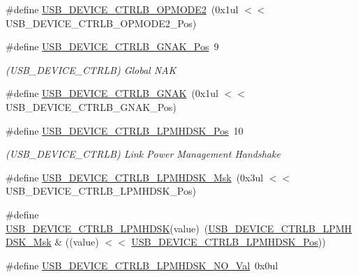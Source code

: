 \begin{DoxyCompactItemize}
\#define \mbox{\hyperlink{group___s_a_m_d21___u_s_b_ga7f75914b68600a87003a7109fad16f6f}{U\+S\+B\+\_\+\+D\+E\+V\+I\+C\+E\+\_\+\+C\+T\+R\+L\+B\+\_\+\+O\+P\+M\+O\+D\+E2}}~(0x1ul $<$$<$ U\+S\+B\+\_\+\+D\+E\+V\+I\+C\+E\+\_\+\+C\+T\+R\+L\+B\+\_\+\+O\+P\+M\+O\+D\+E2\+\_\+\+Pos)
\item 
\#define \mbox{\hyperlink{group___s_a_m_d21___u_s_b_ga0ed47cb7457c19bd0a460ec4f89f1d15}{U\+S\+B\+\_\+\+D\+E\+V\+I\+C\+E\+\_\+\+C\+T\+R\+L\+B\+\_\+\+G\+N\+A\+K\+\_\+\+Pos}}~9
\begin{DoxyCompactList}\small\item\em (U\+S\+B\+\_\+\+D\+E\+V\+I\+C\+E\+\_\+\+C\+T\+R\+LB) Global N\+AK \end{DoxyCompactList}\item 
\#define \mbox{\hyperlink{group___s_a_m_d21___u_s_b_gaf178d923d51212654a8a358a2bc7ddf5}{U\+S\+B\+\_\+\+D\+E\+V\+I\+C\+E\+\_\+\+C\+T\+R\+L\+B\+\_\+\+G\+N\+AK}}~(0x1ul $<$$<$ U\+S\+B\+\_\+\+D\+E\+V\+I\+C\+E\+\_\+\+C\+T\+R\+L\+B\+\_\+\+G\+N\+A\+K\+\_\+\+Pos)
\item 
\#define \mbox{\hyperlink{group___s_a_m_d21___u_s_b_ga7bbe2998f650533b2cc87bb63f7a28de}{U\+S\+B\+\_\+\+D\+E\+V\+I\+C\+E\+\_\+\+C\+T\+R\+L\+B\+\_\+\+L\+P\+M\+H\+D\+S\+K\+\_\+\+Pos}}~10
\begin{DoxyCompactList}\small\item\em (U\+S\+B\+\_\+\+D\+E\+V\+I\+C\+E\+\_\+\+C\+T\+R\+LB) Link Power Management Handshake \end{DoxyCompactList}\item 
\#define \mbox{\hyperlink{group___s_a_m_d21___u_s_b_gad54d31b65a2471f0f9932bf93317119b}{U\+S\+B\+\_\+\+D\+E\+V\+I\+C\+E\+\_\+\+C\+T\+R\+L\+B\+\_\+\+L\+P\+M\+H\+D\+S\+K\+\_\+\+Msk}}~(0x3ul $<$$<$ U\+S\+B\+\_\+\+D\+E\+V\+I\+C\+E\+\_\+\+C\+T\+R\+L\+B\+\_\+\+L\+P\+M\+H\+D\+S\+K\+\_\+\+Pos)
\item 
\#define \mbox{\hyperlink{group___s_a_m_d21___u_s_b_ga145da777e9fe034938c2cc897276ba0d}{U\+S\+B\+\_\+\+D\+E\+V\+I\+C\+E\+\_\+\+C\+T\+R\+L\+B\+\_\+\+L\+P\+M\+H\+D\+SK}}(value)~(\mbox{\hyperlink{group___s_a_m_d21___u_s_b_gad54d31b65a2471f0f9932bf93317119b}{U\+S\+B\+\_\+\+D\+E\+V\+I\+C\+E\+\_\+\+C\+T\+R\+L\+B\+\_\+\+L\+P\+M\+H\+D\+S\+K\+\_\+\+Msk}} \& ((value) $<$$<$ \mbox{\hyperlink{group___s_a_m_d21___u_s_b_ga7bbe2998f650533b2cc87bb63f7a28de}{U\+S\+B\+\_\+\+D\+E\+V\+I\+C\+E\+\_\+\+C\+T\+R\+L\+B\+\_\+\+L\+P\+M\+H\+D\+S\+K\+\_\+\+Pos}}))
\item 
\#define \mbox{\hyperlink{group___s_a_m_d21___u_s_b_gaead1ace8b3c95e077a583fc16f732901}{U\+S\+B\+\_\+\+D\+E\+V\+I\+C\+E\+\_\+\+C\+T\+R\+L\+B\+\_\+\+L\+P\+M\+H\+D\+S\+K\+\_\+\+N\+O\+\_\+\+Val}}~0x0ul

\end{DoxyCompactItemize}
